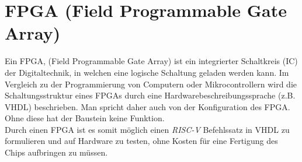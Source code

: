     \section{FPGA (Field Programmable Gate Array)}
        Ein FPGA, (Field Programmable Gate Array) ist ein integrierter Schaltkreis (IC) der Digitaltechnik,
        in welchen eine logische Schaltung geladen werden kann.
        Im Vergleich zu der Programmierung von Computern oder Mikrocontrollern wird die Schaltungsstruktur eines FPGAs durch eine
        Hardwarebeschreibungssprache (z.B. VHDL) beschrieben. Man spricht daher auch von der Konfiguration des FPGA.
        Ohne diese hat der Baustein keine Funktion. \cite{fpga-wiki}
        \\
        Durch einen FPGA ist es somit möglich einen \textit{RISC-V} Befehlssatz in VHDL zu formulieren und auf Hardware zu testen,
        ohne Kosten für eine Fertigung des Chips aufbringen zu müssen.

